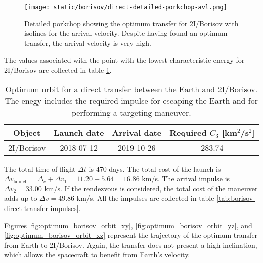 \begin{figure}[H]
  \centering
  \texttt{[image: static/borisov/direct-detailed-porkchop-avl.png]}
        \caption[Detailed porkchop showing the optimum trasnfer for 2I/Borisov
        with the arrival velocity]{Detailed porkchop showing the optimum transfer for
        2I/Borisov with isolines for the arrival velocity. Despite having found
        an optimum transfer, the arrival velocity is very high.}
  \label{fig:borisov-optimum-transfer-porkchop-avl}
\end{figure}

The values associated with the point with the lowest characteristic energy for
2I/Borisov are collected in table \ref{tab:borisov-direct-transfer-optimum}.

\vspace{1cm}
\begin{table}[H]
  \centering
  \begin{tabular}{|c|c|c|c|}
    \hline
    Object & Launch date & Arrival date & Required $C_3$ [km$^2$/s$^2$] \\
    \hline
    2I/Borisov & 2018-07-12 & 2019-10-26 & 283.74 \\
    \hline
  \end{tabular}
  \caption[Optimum orbit for a direct transfer between the Earth and
    2I/Borisov.]{Optimum orbit for a direct transfer between the Earth and
    2I/Borisov. The enegy includes the required impulse for escaping the Earth
    and for performing a targeting maneuver.}
  \label{tab:borisov-direct-transfer-optimum}
\end{table}

The total time of flight $\Delta t$ is 470 days. The total cost of the launch is
$\Delta v_\text{launch} = \Delta_e + \Delta v_1 = 11.20 + 5.64 = 16.86$ km/s.
The arrival impulse is $\Delta v_2 = 33.00$ km/s. If the rendezvous is
considered, the total cost of the maneuver adds up to $\Delta v = 49.86$ km/s.
All the impulses are collected in table
\ref{tab:borisov-direct-transfer-impulses}.

Figures \ref{fig:optimum_borisov_orbit_xy}, \ref{fig:optimum_borisov_orbit_yz},
and \ref{fig:optimum_borisov_orbit_xz} represent the trajectory of the optimum
transfer from Earth to 2I/Borisov. Again, the transfer does not present a high
inclination, which allows the spacecraft to benefit from Earth's velocity.

